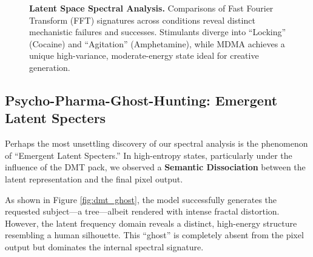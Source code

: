\documentclass[10pt, twocolumn]{article}
\begin{document}
\begin{figure}[!b]
    \caption{\textbf{Latent Space Spectral Analysis.} Comparisons of Fast Fourier Transform (FFT) signatures across conditions reveal distinct mechanistic failures and successes. Stimulants diverge into ``Locking'' (Cocaine) and ``Agitation'' (Amphetamine), while MDMA achieves a unique high-variance, moderate-energy state ideal for creative generation.}
    \label{fig:spectral_analysis_sequence}
\end{figure}

\begin{table}[ht]
    \centering
    \caption{\textbf{Latent Space Spectral Statistics.} Quantitative analysis of the diffusion model's internal state ($N=128$ generations).}
    \label{tab:spectral_stats}
\end{table}

\subsection{Psycho-Pharma-Ghost-Hunting: Emergent Latent Specters}
Perhaps the most unsettling discovery of our spectral analysis is the phenomenon of ``Emergent Latent Specters.'' In high-entropy states, particularly under the influence of the DMT pack, we observed a \textbf{Semantic Dissociation} between the latent representation and the final pixel output.

As shown in Figure \ref{fig:dmt_ghost}, the model successfully generates the requested subject—a tree—albeit rendered with intense fractal distortion. However, the latent frequency domain reveals a distinct, high-energy structure resembling a human silhouette. This ``ghost'' is completely absent from the pixel output but dominates the internal spectral signature.
\end{document}
